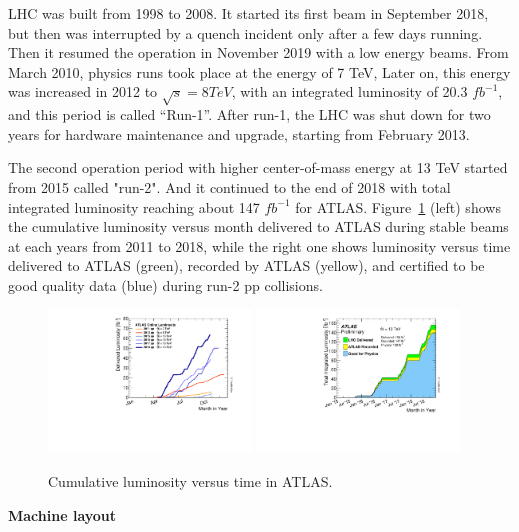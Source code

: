 LHC was built from 1998 to 2008. 
It started its first beam in September 2018, but then was interrupted by a quench incident only after a few days running.
Then it resumed the operation in November 2019 with a low energy beams.
From March 2010, physics runs took place at the energy of 7 TeV,
Later on, this energy was increased in 2012 to $\sqrt{s} = 8TeV$, with an integrated luminosity of 20.3 $fb^{-1}$,
and this period is called “Run-1”.
After run-1, the LHC was shut down for two years for hardware maintenance and upgrade, starting from February 2013.

The second operation period with higher center-of-mass energy at 13 TeV started from 2015 called "run-2".
And it continued to the end of 2018 with total integrated luminosity reaching about 147 $fb^{-1}$ for ATLAS.
Figure~\ref{fig:lumi_vs_month} (left) shows the cumulative luminosity versus month delivered to ATLAS during stable beams 
at each years from 2011 to 2018,
while the right one shows luminosity versus time delivered to ATLAS (green), recorded by ATLAS (yellow), and certified to be good quality data (blue) 
during run-2 pp collisions.
\begin{figure}[!htb]
  \centering
  \includegraphics[width=0.48\textwidth]{figures/Detector/intlumivsyear.pdf}
  \includegraphics[width=0.48\textwidth]{figures/Detector/intlumivstimeRun2DQall.pdf}
  \caption{Cumulative luminosity versus time in ATLAS.}
  \label{fig:lumi_vs_month}
\end{figure}

\textbf{Machine layout}


